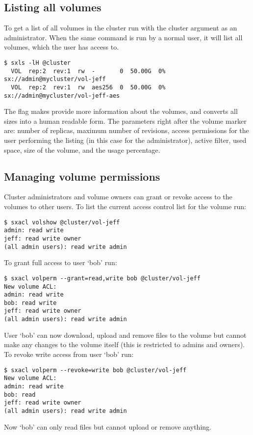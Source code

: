 \subsection{Listing all volumes}
To get a list of all volumes in the cluster run  with the cluster
argument as an administrator. When the same command is run by a normal user,
it will list all volumes, which the user has access to.
\begin{lstlisting}
$ sxls -lH @cluster
  VOL  rep:2  rev:1  rw  -       0  50.00G  0% sx://admin@mycluster/vol-jeff
  VOL  rep:2  rev:1  rw  aes256  0  50.00G  0% sx://admin@mycluster/vol-jeff-aes
\end{lstlisting}
The  flag makes  provide more information
about the volumes, and  converts all sizes into a human readable form.
The parameters right after the volume marker  are: number of replicas,
maximum number of revisions, access permissions for the user performing the
listing (in this case for the administrator), active filter, used space, size
of the volume, and the usage percentage.

\subsection{Managing volume permissions}
Cluster administrators and volume owners can grant or revoke access
to the volumes to other users. To list the current access control list
for the volume  run:
\begin{lstlisting}
$ sxacl volshow @cluster/vol-jeff
admin: read write
jeff: read write owner
(all admin users): read write admin
\end{lstlisting}
To grant full access to user `bob' run:
\begin{lstlisting}
$ sxacl volperm --grant=read,write bob @cluster/vol-jeff
New volume ACL:
admin: read write
bob: read write
jeff: read write owner
(all admin users): read write admin
\end{lstlisting}
User `bob' can now download, upload and remove files to the volume but cannot
make any changes to the volume itself (this is restricted to admins
and owners). To revoke write access from user `bob' run:
\begin{lstlisting}
$ sxacl volperm --revoke=write bob @cluster/vol-jeff
New volume ACL:
admin: read write
bob: read
jeff: read write owner
(all admin users): read write admin
\end{lstlisting}
Now `bob' can only read files but cannot upload or remove anything.

